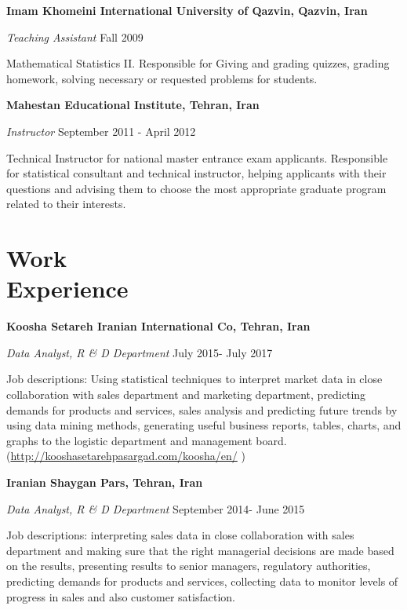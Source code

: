 \documentclass[margin,line]{res}
\begin{document}
\begin{resume}
{\bf Imam Khomeini International University of Qazvin, Qazvin, Iran}

{\em Teaching Assistant} \hfill { Fall 2009}

\vspace{-.3cm}
Mathematical Statistics II. Responsible for Giving and grading quizzes, grading homework, solving necessary or requested problems for students. 

{\bf Mahestan Educational Institute, Tehran, Iran}

\vspace{-.3cm}
{\em Instructor} \hfill { September 2011 - April 2012}

\vspace{-.3cm}
Technical Instructor for national master entrance exam applicants. Responsible for statistical consultant and technical instructor, helping applicants with their questions and advising them to choose the most appropriate graduate program related to their interests.


\section{\sc Work \\ Experience}
{\bf Koosha Setareh Iranian International Co, Tehran, Iran}


{\em Data Analyst, R \& D Department} \hfill { July 2015- July 2017}

\vspace{-.3cm}
Job descriptions: Using statistical techniques to interpret market data in close collaboration with sales department and marketing department, predicting demands for products and services, sales analysis and predicting future trends by using data mining methods, generating useful business reports, tables, charts, and graphs to the logistic department and management board.({\url{http://kooshasetarehpasargad.com/koosha/en/}} )



{\bf Iranian Shaygan Pars, Tehran, Iran }


{\em Data Analyst, R \& D Department} \hfill {  September 2014- June 2015}

\vspace{-.3cm}
Job descriptions: interpreting sales data in close collaboration with sales department and making sure that the right managerial decisions are made based on the results, presenting results to senior managers, regulatory authorities, predicting demands for products and services, collecting data to monitor levels of progress in sales and also customer satisfaction.


\end{resume}
\end{document}
